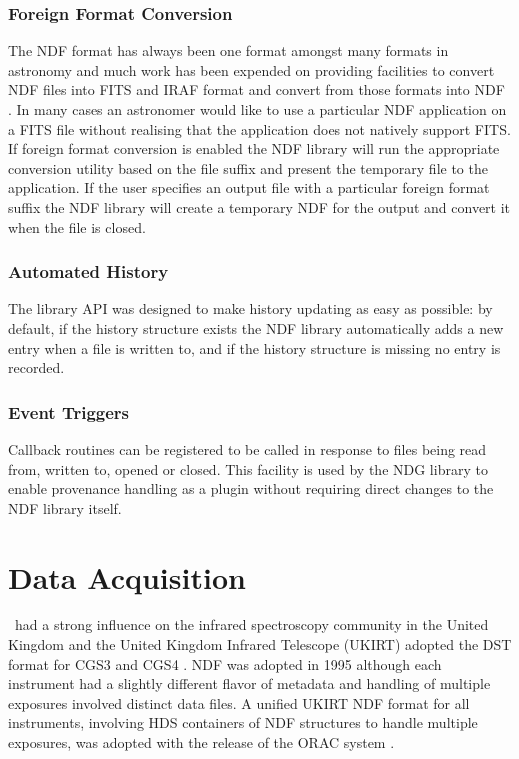 \documentclass[final,authoryear,5p,times,twocolumn]{elsarticle}
\begin{document}
\subsubsection{Foreign Format Conversion}

The NDF format has always been one format amongst many formats in astronomy and much work has been
expended on providing facilities to convert NDF files into FITS and
IRAF format and convert from those formats into NDF \citep{SUN55}. In
many cases an astronomer would like to use a particular NDF
application on a FITS file without realising that the application does
not natively support FITS. If foreign format conversion is enabled the
NDF library will run the appropriate conversion utility based on the
file suffix and present the temporary file to the application. If the
user specifies an output file with a particular foreign format suffix
the NDF library will create a temporary NDF for the output and convert
it when the file is closed.

\subsubsection{Automated History}

The library API was designed to make history updating as easy
as possible: by default, if the history structure exists the NDF
library automatically adds a new entry when a file is written
to, and if the history structure is missing no entry is recorded.

\subsubsection{Event Triggers}

Callback routines can be registered to be called in response to files
being read from, written to, opened or closed. This facility is used
by the NDG library \citep{SUN2} to enable provenance handling
as a plugin without requiring direct changes to the NDF library itself.

\section{Data Acquisition}
\label{sec:daq}

\figaro\ had a strong influence on the infrared spectroscopy community
in the United Kingdom and the United Kingdom Infrared Telescope
(UKIRT) adopted the DST format for CGS3 and CGS4 \citep{1993SPIE.1946..547W}. NDF was adopted in
1995 although each instrument had a slightly different flavor of
metadata and handling of multiple exposures involved distinct data
files. A unified UKIRT NDF format for all instruments, involving HDS
containers of NDF structures to handle multiple exposures, was
adopted with the release of the ORAC system \citep{2000SPIE.4009..227B}.
\end{document}
